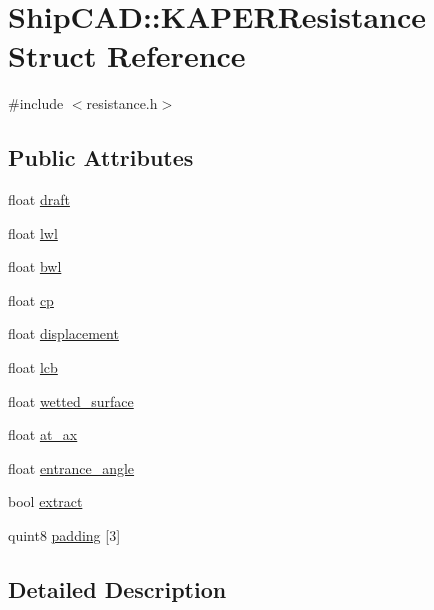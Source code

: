 \hypertarget{structShipCAD_1_1KAPERResistance}{}\section{Ship\+C\+AD\+:\+:K\+A\+P\+E\+R\+Resistance Struct Reference}
\label{structShipCAD_1_1KAPERResistance}


{\ttfamily \#include $<$resistance.\+h$>$}

\subsection*{Public Attributes}
\begin{DoxyCompactItemize}
\item 
float \hyperlink{structShipCAD_1_1KAPERResistance_a0be8d3ba3d4e485abe71c462575b478a}{draft}
\item 
float \hyperlink{structShipCAD_1_1KAPERResistance_a1c2aa0aa33bf7770cd531f1d1ea8b809}{lwl}
\item 
float \hyperlink{structShipCAD_1_1KAPERResistance_ab1cc995ebce998cfc19ef8b1501f328e}{bwl}
\item 
float \hyperlink{structShipCAD_1_1KAPERResistance_a07797d6eb31e9a5506f7fca4b92d3f3a}{cp}
\item 
float \hyperlink{structShipCAD_1_1KAPERResistance_a5227818b90eab4991e339bbdf2e382ca}{displacement}
\item 
float \hyperlink{structShipCAD_1_1KAPERResistance_a3b351285dc50665147ce987e0744b314}{lcb}
\item 
float \hyperlink{structShipCAD_1_1KAPERResistance_a912090d77ad755a5b1506372c24540bc}{wetted\+\_\+surface}
\item 
float \hyperlink{structShipCAD_1_1KAPERResistance_a803e780e97a79538c29af4a28c0afd51}{at\+\_\+ax}
\item 
float \hyperlink{structShipCAD_1_1KAPERResistance_a941bc6efce4bc30f542cae5c68218aee}{entrance\+\_\+angle}
\item 
bool \hyperlink{structShipCAD_1_1KAPERResistance_a61ce222b79ad3964b278f5239dd2618f}{extract}
\item 
quint8 \hyperlink{structShipCAD_1_1KAPERResistance_a6ff5b219f299159cf66bc450d2ac2a73}{padding} \mbox{[}3\mbox{]}
\end{DoxyCompactItemize}


\subsection{Detailed Description}


